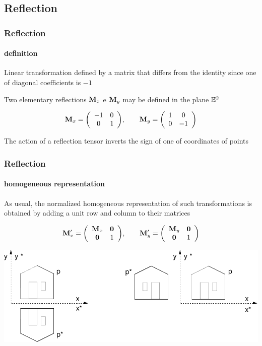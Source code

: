 \documentclass{beamer}
\begin{document}
\subsection{Reflection}
\begin{frame}\frametitle{Reflection}
\framesubtitle{definition}

\vfill

Linear transformation defined by a matrix that differs from the identity since one of diagonal coefficients is  $-1$

\vfill

Two elementary reflections ${\bf M}_{x}$ e ${\bf M}_{y}$ may be defined in the plane $\mathbb{E}^{2}$

\[
{\bf M}_{x}={\left(\begin{array}{cccccccccccccccccccccccccccc}-1 & 0 \\ 0 & 1\end{array}\right)}, \qquad
{\bf M}_{y}={\left(\begin{array}{cccccccccccccccccccccccccccc}1 & 0 \\ 0 & -1\end{array}\right)}
\]

\vfill

The action of a reflection tensor inverts the sign of one of coordinates of points

\end{frame}
\begin{frame}\frametitle{Reflection}
\framesubtitle{homogeneous representation}\small

\vfill
As usual, the normalized homogeneous representation of such transformations is obtained by adding a unit row and column to their matrices

\[
{\bf M}'_{x}={\left(\begin{array}{cccccccccccccccccccccccccccc}{\bf M}_{x} & {\bf 0} \\ {\bf 0} & 1\end{array}\right)}, \qquad
{\bf M}'_{y}={\left(\begin{array}{cccccccccccccccccccccccccccc}{\bf M}_{y} & {\bf 0} \\ {\bf 0} & 1\end{array}\right)}
\]


\vfill

\includegraphics[width=\linewidth]{images/ribaltam}

\end{frame}
\end{document}
